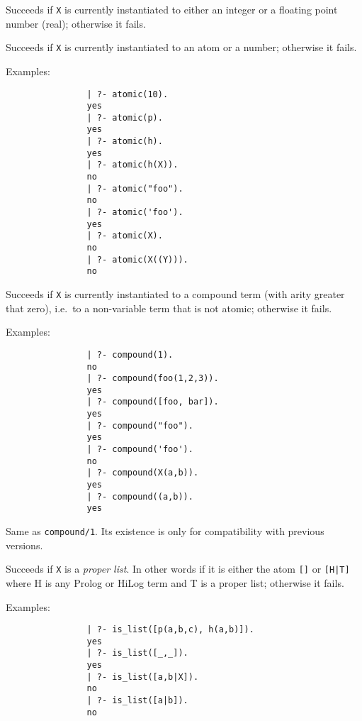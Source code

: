 \begin{description}
    Succeeds if {\tt X} is currently instantiated to either an integer or 
    a floating point number (real); otherwise it fails.

    Succeeds if {\tt X} is currently instantiated to an atom or a number;
    otherwise it fails.

    Examples:
    {\footnotesize
     \begin{verbatim}
                | ?- atomic(10).
                yes
                | ?- atomic(p).
                yes
                | ?- atomic(h).
                yes
                | ?- atomic(h(X)).
                no
                | ?- atomic("foo").
                no
                | ?- atomic('foo').
                yes
                | ?- atomic(X).
                no
                | ?- atomic(X((Y))).
                no
     \end{verbatim}}

    Succeeds if {\tt X} is currently instantiated to a compound term (with 
    arity greater that zero), i.e.\ to a non-variable term that is not atomic;
    otherwise it fails.

    Examples:
    {\footnotesize
     \begin{verbatim}
                | ?- compound(1).
                no
                | ?- compound(foo(1,2,3)).
                yes
                | ?- compound([foo, bar]).
                yes
                | ?- compound("foo").
                yes
                | ?- compound('foo').
                no
                | ?- compound(X(a,b)).
                yes
                | ?- compound((a,b)).
                yes	
     \end{verbatim}}

    Same as {\tt compound/1}\@. Its existence is only for compatibility 
    with previous versions.

    Succeeds if {\tt X} is a {\em proper list}. In other words if it is 
    either the atom {\tt []} or {\tt [H|T]} where H is any Prolog or HiLog
    term and T is a proper list; otherwise it fails.

    Examples:
    {\footnotesize
     \begin{verbatim}
                | ?- is_list([p(a,b,c), h(a,b)]).
                yes
                | ?- is_list([_,_]).
                yes
                | ?- is_list([a,b|X]).
                no
                | ?- is_list([a|b]).
                no
     \end{verbatim}}


\end{description}
